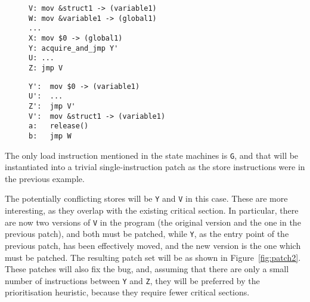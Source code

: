 \documentclass[10pt,letter,twocolumn]{sigplanconf}
\makeatletter
\newenvironment{subfloat}%
    {\def\caption##1{\gdef\subcapsave{\relax##1}}%
     \let\subcapsave=\@empty %
     \let\sf@oldlabel=\label
     \def\label##1{\xdef\sublabsave{\noexpand\label{##1}}}%
     \let\sublabsave\relax    %
     \setbox\subfigbox\hbox
       \bgroup}%
      {\egroup                %
     \let\label=\sf@oldlabel
     \subfigure[\subcapsave]{\box\subfigbox}}%
\makeatother
\begin{document}
\begin{figure}
  \begin{subfloat}
    \begin{minipage}{60mm}
\begin{verbatim}
V: mov &struct1 -> (variable1)
W: mov &variable1 -> (global1)
...
X: mov $0 -> (global1)
Y: acquire_and_jmp Y'
U: ...
Z: jmp V
\end{verbatim}
    \end{minipage}
  \end{subfloat}
  \begin{subfloat}
    \begin{minipage}{50mm}
\begin{verbatim}
Y':  mov $0 -> (variable1)
U':  ...
Z':  jmp V'
V':  mov &struct1 -> (variable1)
a:   release()
b:   jmp W
\end{verbatim}
    \end{minipage}
  \end{subfloat}
  \caption{Partial patch based on the state machine in figure~\ref{fig:specialise_taken}.}
  \label{fig:patch1}
\end{figure}

The only load instruction mentioned in the state machines is \verb|G|,
and that will be instantiated into a trivial single-instruction patch
as the store instructions were in the previous example.

The potentially conflicting stores will be \verb|Y| and \verb|V| in
this case.  These are more interesting, as they overlap with the
existing critical section.  In particular, there are now two versions
of \verb|V| in the program (the original version and the one in the
previous patch), and both must be patched, while \verb|Y|, as the
entry point of the previous patch, has been effectively moved, and the
new version is the one which must be patched.  The resulting patch set
will be as shown in Figure~\ref{fig:patch2}.  These patches will also
fix the bug, and, assuming that there are only a small number of
instructions between \verb|Y| and \verb|Z|, they will be preferred by
the prioritisation heuristic, because they require fewer critical
sections.
\end{document}
